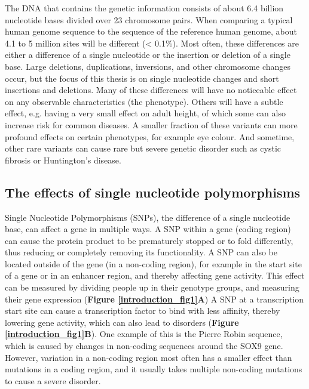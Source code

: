 The DNA that contains the genetic information consists of about 6.4 billion nucleotide bases divided over 23 chromosome pairs. When comparing a typical human genome sequence to the sequence of the reference human genome, about 4.1 to 5 million sites will be different (< 0.1\%). Most often, these differences are either a difference of a single nucleotide or the insertion or deletion of a single base\cite{the1000genomesprojectconsortiumGlobalReferenceHuman2015}. Large deletions, duplications, inversions, and other chromosome changes occur, but the focus of this thesis is on single nucleotide changes and short insertions and deletions. Many of these differences will have no noticeable effect on any observable characteristics (the phenotype). Others will have a subtle effect, e.g. having a very small effect on adult height, of which some can also increase risk for common diseases. A smaller fraction of these variants can more profound effects on certain phenotypes, for example eye colour. And sometime, other rare variants can cause rare but severe genetic disorder such as cystic fibrosis or Huntington’s disease. 


\subsection{The effects of single nucleotide polymorphisms}

Single Nucleotide Polymorphisms (SNPs), the difference of a single nucleotide base, can affect a gene in multiple ways. A SNP within a gene (coding region) can cause the protein product to be prematurely stopped\cite{deboeverMedicalRelevanceProteintruncating2018} or to fold differently\cite{vihinenTypesEffectsProtein2015}, thus reducing or completely removing its functionality. A SNP can also be located outside of the gene (in a non-coding region), for example in the start site of a gene or in an enhancer region, and thereby affecting gene activity. This effect can be measured by dividing people up in their genotype groups, and measuring their gene expression (\textbf{Figure \ref{introduction_fig1}A}) A SNP at a transcription start site can cause a transcription factor to bind with less affinity, thereby lowering gene activity, which can also lead to disorders (\textbf{Figure \ref{introduction_fig1}B}). One example of this is the Pierre Robin sequence, which is caused by changes in non-coding sequences around the SOX9 gene\cite{benkoHighlyConservedNoncoding2009}. However, variation in a non-coding region most often has a smaller effect than mutations in a coding region, and it usually takes multiple non-coding mutations to cause a severe disorder.


